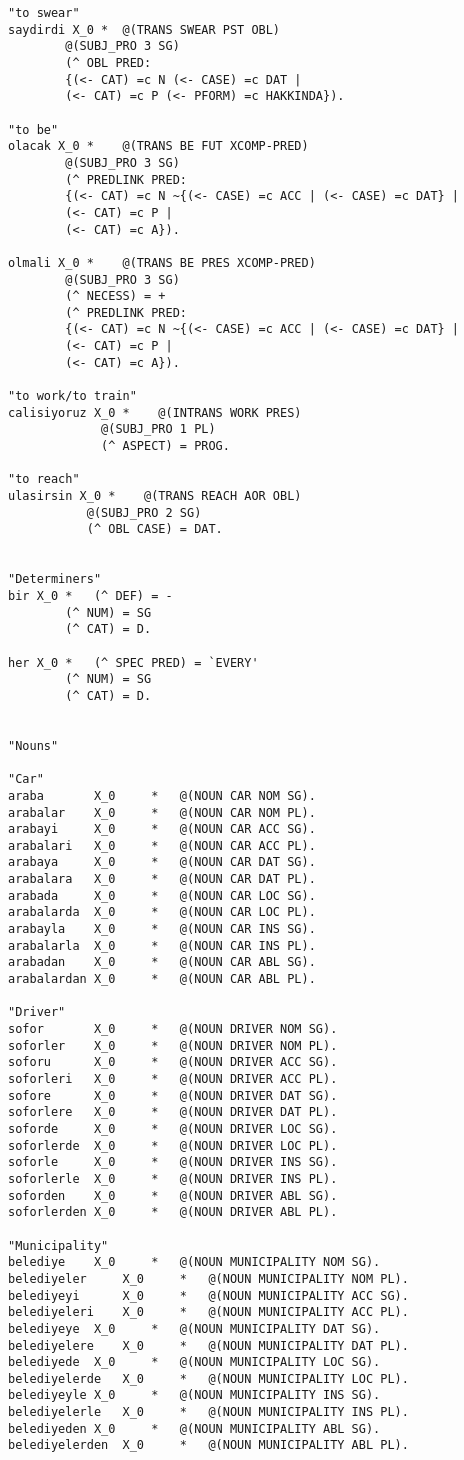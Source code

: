 \begin{lstlisting}
"to swear"
saydirdi X_0 *  @(TRANS SWEAR PST OBL)
		@(SUBJ_PRO 3 SG)
		(^ OBL PRED: 
		{(<- CAT) =c N (<- CASE) =c DAT | 
		(<- CAT) =c P (<- PFORM) =c HAKKINDA}).

"to be"				
olacak X_0 *    @(TRANS BE FUT XCOMP-PRED)
		@(SUBJ_PRO 3 SG)
		(^ PREDLINK PRED: 
		{(<- CAT) =c N ~{(<- CASE) =c ACC | (<- CASE) =c DAT} | 
		(<- CAT) =c P | 
		(<- CAT) =c A}).

olmali X_0 *    @(TRANS BE PRES XCOMP-PRED)
		@(SUBJ_PRO 3 SG)
		(^ NECESS) = +
		(^ PREDLINK PRED: 
		{(<- CAT) =c N ~{(<- CASE) =c ACC | (<- CASE) =c DAT} | 
		(<- CAT) =c P | 
		(<- CAT) =c A}).

"to work/to train"
calisiyoruz X_0 *    @(INTRANS WORK PRES)
		     @(SUBJ_PRO 1 PL)
		     (^ ASPECT) = PROG.

"to reach"
ulasirsin X_0 *	   @(TRANS REACH AOR OBL)
		   @(SUBJ_PRO 2 SG)
		   (^ OBL CASE) = DAT.


"Determiners"
bir X_0 *   (^ DEF) = -
	    (^ NUM) = SG
	    (^ CAT) = D.
	    
her X_0 *   (^ SPEC PRED) = `EVERY'
	    (^ NUM) = SG
	    (^ CAT) = D.


"Nouns"						

"Car"
araba	  	X_0 	* 	@(NOUN CAR NOM SG).
arabalar 	X_0 	* 	@(NOUN CAR NOM PL).
arabayi   	X_0 	* 	@(NOUN CAR ACC SG).
arabalari 	X_0 	* 	@(NOUN CAR ACC PL).
arabaya	  	X_0 	* 	@(NOUN CAR DAT SG).
arabalara 	X_0 	* 	@(NOUN CAR DAT PL).
arabada		X_0 	* 	@(NOUN CAR LOC SG).
arabalarda	X_0 	* 	@(NOUN CAR LOC PL).
arabayla	X_0 	* 	@(NOUN CAR INS SG).
arabalarla	X_0 	* 	@(NOUN CAR INS PL).
arabadan	X_0 	* 	@(NOUN CAR ABL SG).
arabalardan	X_0 	* 	@(NOUN CAR ABL PL).

"Driver"
sofor	  	X_0 	* 	@(NOUN DRIVER NOM SG).
soforler 	X_0 	* 	@(NOUN DRIVER NOM PL).
soforu   	X_0 	* 	@(NOUN DRIVER ACC SG).
soforleri 	X_0 	* 	@(NOUN DRIVER ACC PL).
sofore	  	X_0 	* 	@(NOUN DRIVER DAT SG).
soforlere 	X_0 	* 	@(NOUN DRIVER DAT PL).
soforde		X_0 	* 	@(NOUN DRIVER LOC SG).
soforlerde	X_0 	* 	@(NOUN DRIVER LOC PL).
soforle		X_0 	* 	@(NOUN DRIVER INS SG).
soforlerle	X_0 	* 	@(NOUN DRIVER INS PL).
soforden	X_0 	* 	@(NOUN DRIVER ABL SG).
soforlerden	X_0 	* 	@(NOUN DRIVER ABL PL).

"Municipality"
belediye	X_0 	* 	@(NOUN MUNICIPALITY NOM SG).
belediyeler 	X_0 	* 	@(NOUN MUNICIPALITY NOM PL).
belediyeyi   	X_0 	* 	@(NOUN MUNICIPALITY ACC SG).
belediyeleri 	X_0 	* 	@(NOUN MUNICIPALITY ACC PL).
belediyeye	X_0 	* 	@(NOUN MUNICIPALITY DAT SG).
belediyelere 	X_0 	* 	@(NOUN MUNICIPALITY DAT PL).
belediyede	X_0 	* 	@(NOUN MUNICIPALITY LOC SG).
belediyelerde	X_0 	* 	@(NOUN MUNICIPALITY LOC PL).
belediyeyle	X_0 	* 	@(NOUN MUNICIPALITY INS SG).
belediyelerle	X_0 	* 	@(NOUN MUNICIPALITY INS PL).
belediyeden	X_0 	* 	@(NOUN MUNICIPALITY ABL SG).
belediyelerden	X_0 	* 	@(NOUN MUNICIPALITY ABL PL).


\end{lstlisting}
